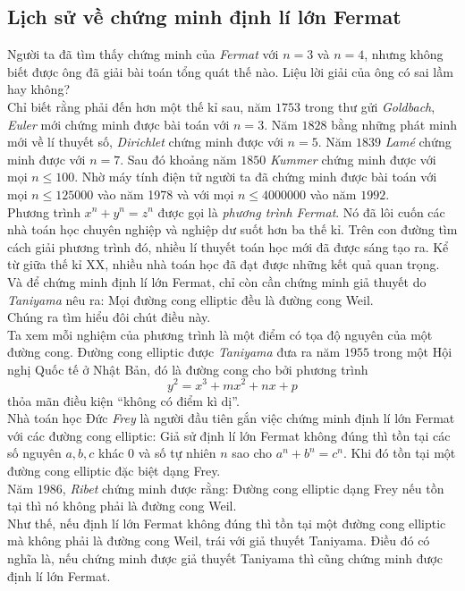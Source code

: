 \subsection{Lịch sử về chứng minh định lí lớn Fermat}\label{lsdlfm}
Người ta đã tìm thấy chứng minh của \textit{Fermat} với $n=3$ và $n=4$, nhưng không biết được ông đã giải bài toán tổng quát thế nào. Liệu lời giải của ông có sai lầm hay không?\\
Chỉ biết rằng phải đến hơn một thế kỉ sau, năm $1753$ trong thư gửi \textit{Goldbach}, \textit{Euler} mới chứng minh được bài toán với $n=3$. Năm $1828$ bằng những phát minh mới về lí thuyết số, \textit{Dirichlet} chứng minh được với $n=5$. Năm $1839$ \textit{Lamé} chứng minh được với $n=7$. Sau đó khoảng năm $1850$ \textit{Kummer} chứng minh được với mọi $n\le 100$. Nhờ máy tính điện tử người ta đã chứng minh được bài toán với mọi $n\le 125000$ vào năm 1978 và với mọi $n\le 4000000$ vào năm $1992$.\\
Phương trình $x^n+y^n=z^n$ được gọi là \textit{phương trình Fermat}. Nó đã lôi cuốn các nhà toán học chuyên nghiệp và nghiệp dư suốt hơn ba thế kỉ. Trên con đường tìm cách giải phương trình đó, nhiều lí thuyết toán học mới đã được sáng tạo ra. Kể từ giữa thế kỉ XX, nhiều nhà toán học đã đạt được những kết quả quan trọng. Và để chứng minh định lí lớn Fermat, chỉ còn cần chứng minh giả thuyết do \textit{Taniyama} nêu ra: Mọi đường cong elliptic đều là đường cong Weil.\\
Chúng ra tìm hiểu đôi chút điều này.\\
Ta xem mỗi nghiệm của phương trình là một điểm có tọa độ nguyên của một đường cong. Đường cong elliptic được \textit{Taniyama} đưa ra năm $1955$ trong một Hội nghị Quốc tế ở Nhật Bản, đó là đường cong cho bởi phương trình $$y^2=x^3+mx^2+nx+p$$
thỏa mãn điều kiện ``không có điểm kì dị''.\\
Nhà toán học Đức \textit{Frey} là người đầu tiên gắn việc chứng minh định lí lớn Fermat với các đường cong elliptic: Giả sử định lí lớn Fermat không đúng thì tồn tại các số nguyên $a,b,c$ khác $0$ và số tự nhiên $n$ sao cho $a^n+b^n=c^n$. Khi đó tồn tại một đường cong elliptic đặc biệt dạng Frey.\\
Năm $1986$, \textit{Ribet} chứng minh được rằng: Đường cong elliptic dạng Frey nếu tồn tại thì nó không phải là đường cong Weil.\\
Như thế, nếu định lí lớn Fermat không đúng thì tồn tại một đường cong elliptic mà không phải là đường cong Weil, trái với giả thuyết Taniyama. Điều đó có nghĩa là, nếu chứng minh được giả thuyết Taniyama thì cũng chứng minh được định lí lớn Fermat.\\
